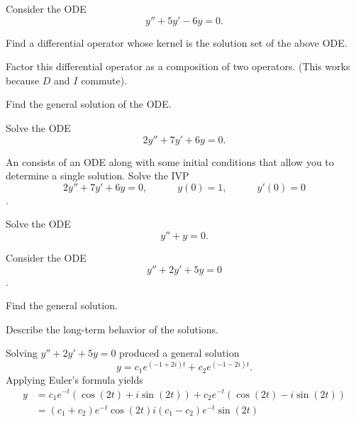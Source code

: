 
\begin{applicationActivities}

\begin{activity}{5}
Consider the ODE \[y''+5y'-6y=0.\]
\vfill
\begin{subactivity}
Find a differential operator whose kernel is the solution set of the above ODE.
\end{subactivity}
\begin{subactivity}
Factor this differential operator as a composition of two operators. (This works because \(D\) and \(I\) commute).
\end{subactivity}
\begin{subactivity}
Find the general solution of the ODE.
\end{subactivity}
\end{activity}

\begin{activity}{5}
Solve the ODE \[ 2y''+7y'+6y=0.\]
\end{activity}

\begin{activity}{5}
An  consists of an ODE along with some initial conditions that allow you to determine a single solution.
\vfill
Solve the IVP \[2y''+7y'+6y=0, \hspace{3em} y(0)=1, \hspace{3em} y'(0)=0\].
\end{activity}

\begin{activity}{5}
Solve the ODE \[ y''+y=0.\]
\end{activity}

\begin{activity}{15}
Consider the ODE \[y''+2y'+5y=0\].
\vfill
\begin{subactivity}
Find the general solution.
\end{subactivity}
\begin{subactivity}
Describe the long-term behavior of the solutions.
\end{subactivity}
\end{activity}

\begin{observation}
Solving \(y''+2y'+5y=0\) produced a general solution
\[y=c_1 e^{(-1+2i)t}+c_2 e^{(-1-2i)t}.\]
Applying Euler's formula yields
 \begin{alignat*}{2}
y&=c_1e^{-t} \left(\cos(2t)+i\sin(2t)\right)+c_2 e^{-t} \left(\cos(2t)-i\sin(2t)\right) \\
&=(c_1+c_2)e^{-t} \cos(2t) i(c_1-c_2) e^{-t} \sin(2t)
\end{alignat*}


\end{observation}
\end{applicationActivities}
